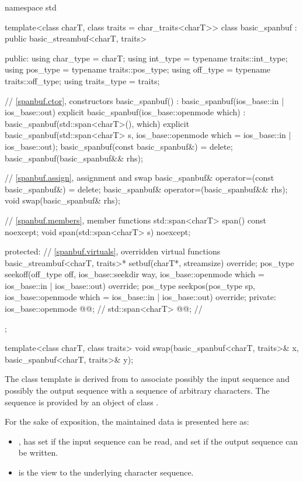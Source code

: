 %
\begin{codeblock}
namespace std {
  template<class charT, class traits = char_traits<charT>>
  class basic_spanbuf
    : public basic_streambuf<charT, traits> {
  public:
    using char_type   = charT;
    using int_type    = typename traits::int_type;
    using pos_type    = typename traits::pos_type;
    using off_type    = typename traits::off_type;
    using traits_type = traits;

    // \ref{spanbuf.ctor}, constructors
    basic_spanbuf() : basic_spanbuf(ios_base::in | ios_base::out) {}
    explicit basic_spanbuf(ios_base::openmode which)
      : basic_spanbuf(std::span<charT>(), which) {}
    explicit basic_spanbuf(std::span<charT> s,
                           ios_base::openmode which = ios_base::in | ios_base::out);
    basic_spanbuf(const basic_spanbuf&) = delete;
    basic_spanbuf(basic_spanbuf&& rhs);

    // \ref{spanbuf.assign}, assignment and swap
    basic_spanbuf& operator=(const basic_spanbuf&) = delete;
    basic_spanbuf& operator=(basic_spanbuf&& rhs);
    void swap(basic_spanbuf& rhs);

    // \ref{spanbuf.members}, member functions
    std::span<charT> span() const noexcept;
    void span(std::span<charT> s) noexcept;

  protected:
    // \ref{spanbuf.virtuals}, overridden virtual functions
    basic_streambuf<charT, traits>* setbuf(charT*, streamsize) override;
    pos_type seekoff(off_type off, ios_base::seekdir way,
                     ios_base::openmode which = ios_base::in | ios_base::out) override;
    pos_type seekpos(pos_type sp,
                     ios_base::openmode which = ios_base::in | ios_base::out) override;
  private:
    ios_base::openmode @@;            // \expos
    std::span<charT> @@;               // \expos
};

template<class charT, class traits>
  void swap(basic_spanbuf<charT, traits>& x, basic_spanbuf<charT, traits>& y);
}
\end{codeblock}

\pnum
The class template  is derived from 
to associate possibly the input sequence and possibly the output sequence
with a sequence of arbitrary characters.
The sequence is provided by an object of class .

\pnum
For the sake of exposition, the maintained data is presented here as:
\begin{itemize}
\item
{}, has
 set if the input sequence can be read, and
 set if the output sequence can be written.
\item
{} is the view to
the underlying character sequence.
\end{itemize}


